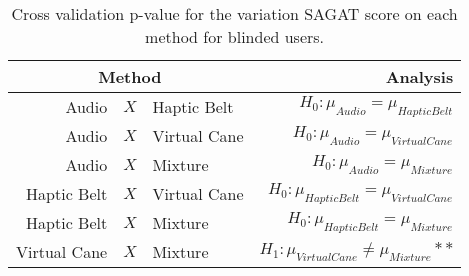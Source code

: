 
\begin{table}[!htb]
\centering
\caption{Cross validation p-value for the variation SAGAT score on each method for blinded users.}
\label{tab:lsd_sagat_var_sight}
\begin{tabular}{rclr}
\toprule
      \multicolumn{3}{c}{Method} &                                       Analysis \\
\midrule
       Audio & $X$ & Haptic Belt &        $H_0 : \mu_{Audio} = \mu_{Haptic Belt}$ \\
      Audio & $X$ & Virtual Cane &       $H_0 : \mu_{Audio} = \mu_{Virtual Cane}$ \\
           Audio & $X$ & Mixture &            $H_0 : \mu_{Audio} = \mu_{Mixture}$ \\
Haptic Belt & $X$ & Virtual Cane & $H_0 : \mu_{Haptic Belt} = \mu_{Virtual Cane}$ \\
     Haptic Belt & $X$ & Mixture &      $H_0 : \mu_{Haptic Belt} = \mu_{Mixture}$ \\
    Virtual Cane & $X$ & Mixture & $H_1 : \mu_{Virtual Cane} \ne \mu_{Mixture}**$ \\
\bottomrule
\end{tabular}
\end{table}

